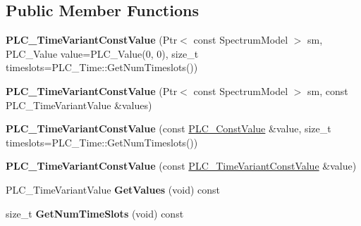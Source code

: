 \subsection*{\-Public \-Member \-Functions}
\begin{DoxyCompactItemize}
\item 
\hypertarget{classns3_1_1PLC__TimeVariantConstValue_a95cab71046845e966a5aefbc701b90d3}{{\bfseries \-P\-L\-C\-\_\-\-Time\-Variant\-Const\-Value} (\-Ptr$<$ const \-Spectrum\-Model $>$ sm, \-P\-L\-C\-\_\-\-Value value=\-P\-L\-C\-\_\-\-Value(0, 0), size\-\_\-t timeslots=\-P\-L\-C\-\_\-\-Time\-::\-Get\-Num\-Timeslots())}\label{classns3_1_1PLC__TimeVariantConstValue_a95cab71046845e966a5aefbc701b90d3}

\item 
\hypertarget{classns3_1_1PLC__TimeVariantConstValue_a6a31f2bb3f82a3d770f36751f3e1d2db}{{\bfseries \-P\-L\-C\-\_\-\-Time\-Variant\-Const\-Value} (\-Ptr$<$ const \-Spectrum\-Model $>$ sm, const \-P\-L\-C\-\_\-\-Time\-Variant\-Value \&values)}\label{classns3_1_1PLC__TimeVariantConstValue_a6a31f2bb3f82a3d770f36751f3e1d2db}

\item 
\hypertarget{classns3_1_1PLC__TimeVariantConstValue_ab076e653912ba8df19558e98be5afdc0}{{\bfseries \-P\-L\-C\-\_\-\-Time\-Variant\-Const\-Value} (const \hyperlink{classns3_1_1PLC__ConstValue}{\-P\-L\-C\-\_\-\-Const\-Value} \&value, size\-\_\-t timeslots=\-P\-L\-C\-\_\-\-Time\-::\-Get\-Num\-Timeslots())}\label{classns3_1_1PLC__TimeVariantConstValue_ab076e653912ba8df19558e98be5afdc0}

\item 
\hypertarget{classns3_1_1PLC__TimeVariantConstValue_af421c6ebec71df982193b2a77b42788d}{{\bfseries \-P\-L\-C\-\_\-\-Time\-Variant\-Const\-Value} (const \hyperlink{classns3_1_1PLC__TimeVariantConstValue}{\-P\-L\-C\-\_\-\-Time\-Variant\-Const\-Value} \&value)}\label{classns3_1_1PLC__TimeVariantConstValue_af421c6ebec71df982193b2a77b42788d}

\item 
\hypertarget{classns3_1_1PLC__TimeVariantConstValue_afb4300d565aacb457bdf6a4a39ad37ac}{\-P\-L\-C\-\_\-\-Time\-Variant\-Value {\bfseries \-Get\-Values} (void) const }\label{classns3_1_1PLC__TimeVariantConstValue_afb4300d565aacb457bdf6a4a39ad37ac}

\item 
\hypertarget{classns3_1_1PLC__TimeVariantConstValue_a771d65be5e6ad86d89310e341f06f937}{size\-\_\-t {\bfseries \-Get\-Num\-Time\-Slots} (void) const }\label{classns3_1_1PLC__TimeVariantConstValue_a771d65be5e6ad86d89310e341f06f937}


\end{DoxyCompactItemize}
